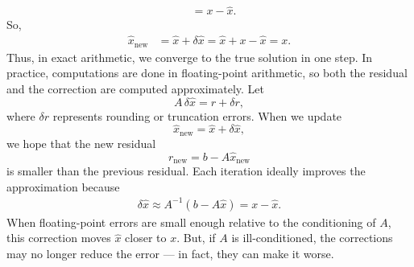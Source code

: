 \documentclass{report}
\begin{document}
\begin{itemize}
\begin{align*}
                                        &= x - \hat{x}
            .\end{align*}
            So, 
            \begin{align*}
                \hat{x}_{\text{new}} &= \hat{x} + \delta \hat{x} = \hat{x} + x - \hat{x} = x
            .\end{align*}
            Thus, in exact arithmetic, we converge to the true solution in one step.
            \bigbreak \noindent 
            In practice, computations are done in floating-point arithmetic, so both the residual and the correction are computed approximately. 
            Let 
            \[
                A\,\delta\hat{x} = r + \delta r,
            \]
            where $\delta r$ represents rounding or truncation errors. When we update
            \[
                \hat{x}_{\text{new}} = \hat{x} + \delta\hat{x},
            \]
            we hope that the new residual
            \[
                r_{\text{new}} = b - A\hat{x}_{\text{new}}
            \]
            is smaller than the previous residual. Each iteration ideally improves the approximation because
            \begin{align*}
                \delta \hat{x} \approx A^{-1}(b - A\hat{x}) = x - \hat{x}
            .\end{align*}
            When floating-point errors are small enough relative to the conditioning of $A$, this correction moves $\hat{x} $ closer to $x$. But, if $A$ is ill-conditioned, the corrections may no longer reduce the error — in fact, they can make it worse.
    \end{itemize}



    
\end{document}
